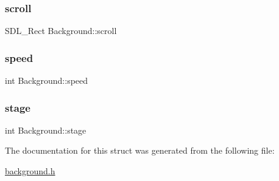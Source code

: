 \mbox{\label{structBackground_a1b6382669cea0e079a66ae195d09efd9}} 
\subsubsection{\texorpdfstring{scroll}{scroll}}
{\footnotesize\ttfamily S\+D\+L\+\_\+\+Rect Background\+::scroll}

\mbox{\label{structBackground_a9ca8ab7528306796c4a254517458fdfe}} 
\subsubsection{\texorpdfstring{speed}{speed}}
{\footnotesize\ttfamily int Background\+::speed}

\mbox{\label{structBackground_a24bfe0184015610a8f9aacd98509d71b}} 
\subsubsection{\texorpdfstring{stage}{stage}}
{\footnotesize\ttfamily int Background\+::stage}



The documentation for this struct was generated from the following file\+:\begin{DoxyCompactItemize}
\item 
\hyperlink{background_8h}{background.\+h}\end{DoxyCompactItemize}

